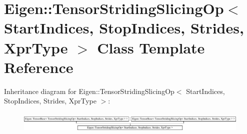 \hypertarget{class_eigen_1_1_tensor_striding_slicing_op}{}\section{Eigen\+:\+:Tensor\+Striding\+Slicing\+Op$<$ Start\+Indices, Stop\+Indices, Strides, Xpr\+Type $>$ Class Template Reference}
\label{class_eigen_1_1_tensor_striding_slicing_op}
Inheritance diagram for Eigen\+:\+:Tensor\+Striding\+Slicing\+Op$<$ Start\+Indices, Stop\+Indices, Strides, Xpr\+Type $>$\+:\begin{figure}[H]
\begin{center}
\leavevmode
\includegraphics[height=1.007194cm]{class_eigen_1_1_tensor_striding_slicing_op}
\end{center}
\end{figure}
